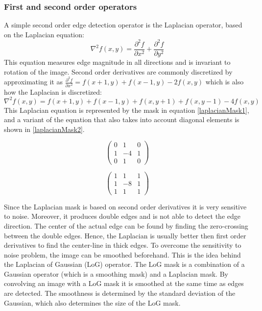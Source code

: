 \subsubsection{First and second order operators}
A simple second order edge detection operator is the Laplacian operator, based on the Laplacian equation:
\begin{equation}
\nabla^2f(x,y) = \frac{\partial^2 f}{\partial x^2} + \frac{\partial^2 f}{\partial y^2}
\end{equation}
This equation measures edge magnitude in all directions and is invariant to rotation of the image. Second order derivatives are commonly discretized by approximating it as \(\frac{\partial^2 f}{\partial x^2} = f(x+1,y) + f(x-1,y) - 2f(x,y)\) which is also how the Laplacian is discretized: 
\begin{equation}
\nabla^2f(x,y) = f(x+1,y) + f(x-1,y) + f(x,y+1) + f(x,y-1) - 4f(x,y)
\end{equation}
This Laplacian equation is represented by the mask in equation \ref{laplacianMask1}, and a variant of the equation that also takes into account diagonal elements is shown in \ref{laplacianMask2}.
\newline
\newline 
\begin{minipage}{.45\textwidth}
\begin{equation}
\begin{pmatrix}
0 & 1 & 0 \\
1 & -4 & 1 \\
0 & 1 & 0
\end{pmatrix}
\label{laplacianMask1}
\end{equation}
\end{minipage}
\begin{minipage}{.45\textwidth}
\begin{equation}
\begin{pmatrix}
1 & 1 & 1 \\
1 & -8 & 1 \\
1 & 1 & 1
\end{pmatrix}
\label{laplacianMask2}
\end{equation}
\end{minipage}
\newline
\newline

Since the Laplacian mask is based on second order derivatives it is very sensitive to noise. Moreover, it produces double edges and is not able to detect the edge direction. The center of the actual edge can be found by finding the zero-crossing between the double edges. Hence, the Laplacian is usually better then first order derivatives to find the center-line in thick edges. To overcome the sensitivity to noise problem, the image can be smoothed beforehand. This is the idea behind the Laplacian of Gaussian (LoG) operator. The LoG mask is a combination of a Gaussian operator (which is a smoothing mask) and a Laplacian mask. By convolving an image with a LoG mask it is smoothed at the same time as edges are detected. The smoothness is determined by the standard deviation of the Gaussian, which also determines the size of the LoG mask.

